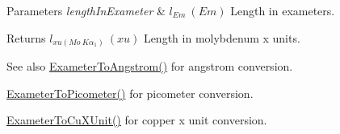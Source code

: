 \begin{DoxyParams}{Parameters}
{\em length\+In\+Exameter} & $ l_{Em}\ (Em)$ Length in exameters. \\
\hline
\end{DoxyParams}
\begin{DoxyReturn}{Returns}
$ l_{xu(Mo\ K\alpha_1)}\ (xu)$ Length in molybdenum x units. 
\end{DoxyReturn}
\begin{DoxySeeAlso}{See also}
\mbox{\hyperlink{group___e_g_x_math-_conversions-_length_conversions-_exameter-_non-_s_i_ga24d2ee057470ce37f99d31451e010a22}{Exameter\+To\+Angstrom()}} for angstrom conversion. 

\mbox{\hyperlink{group___e_g_x_math-_conversions-_length_conversions-_exameter-_s_i_gaf524e8324fedf2eb61d43ce1dc36bcac}{Exameter\+To\+Picometer()}} for picometer conversion. 

\mbox{\hyperlink{group___e_g_x_math-_conversions-_length_conversions-_exameter-_non-_s_i_gacb2c9fea6b2c2d12ee485f378f5a6af0}{Exameter\+To\+Cu\+X\+Unit()}} for copper x unit conversion. 
\end{DoxySeeAlso}

